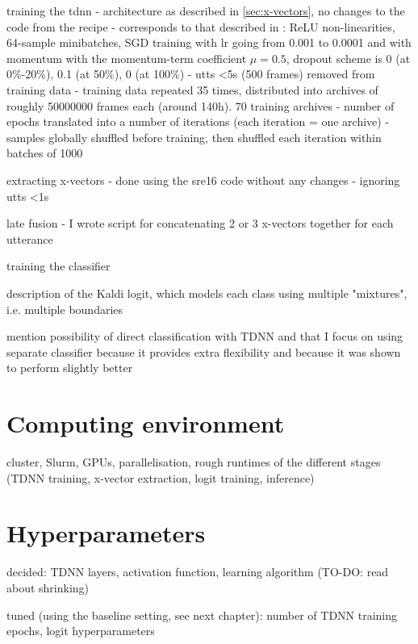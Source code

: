 \documentclass[bsc,frontabs,twoside,singlespacing,parskip,deptreport]{infthesis}
\begin{document}
{{    training the tdnn
    - architecture as described in \autoref{sec:x-vectors}, no changes to the code from the recipe
    - corresponds to that described in \citet{Snyder_et_al_2018}: ReLU non-linearities, 64-sample minibatches, SGD training with lr going from 0.001 to 0.0001 and with momentum with the momentum-term coefficient $\mu=0.5$, dropout scheme is 0 (at 0\%-20\%), 0.1 (at 50\%), 0 (at 100\%)
    - utts <5s (500 frames) removed from training data
    - training data repeated 35 times, distributed into archives of roughly 50000000 frames each (around 140h). 70 training archives
    - number of epochs translated into a number of iterations (each iteration = one archive)
    - samples globally shuffled before training, then shuffled each iteration within batches of 1000

    extracting x-vectors
    - done using the sre16 code without any changes
    - ignoring utts <1s

    late fusion
    - I wrote script for concatenating 2 or 3 x-vectors together for each utterance

    training the classifier

    description of the Kaldi logit, which models each class using multiple "mixtures", i.e. multiple boundaries
    
    mention possibility of direct classification with TDNN and that I focus on using separate classifier because it provides extra flexibility and because it was shown to perform slightly better
  }

  \section{Computing environment}{
    cluster, Slurm, GPUs, parallelisation, rough runtimes of the different stages (TDNN training, x-vector extraction, logit training, inference)
  }

  \section{Hyperparameters}{
    decided: TDNN layers, activation function, learning algorithm (TO-DO: read about shrinking)

    tuned (using the baseline setting, see next chapter): number of TDNN training epochs, logit hyperparameters
  }
}
\end{document}
